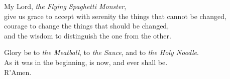 \documentclass[11pt, a4paper, onecolumn, oneside]{report}
\begin{document}
        \begin{center}
            My Lord, \textit{the Flying Spaghetti Monster},\\
            give us grace to accept with serenity the things that cannot be changed,\\
            courage to change the things that should be changed,\\
            and the wisdom to distinguish the one from the other.

            \medspace

            Glory be to \textit{the Meatball}, to \textit{the Sauce}, and to \textit{the Holy Noodle}. \\
            As it was in the beginning, is now, and ever shall be. \\
            R'Amen.
        \end{center}
    \clearpage

\hbox{ }
\thispagestyle{empty}
\clearpage
\end{document}
